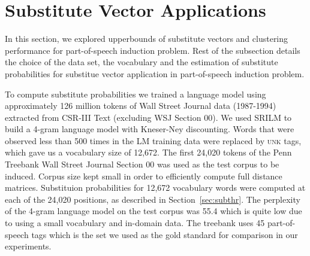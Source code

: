 \section{Substitute Vector Applications}
\label{sec:subapp}
In this section, we explored upperbounds of substitute vectors and
clustering performance for part-of-speech induction problem. Rest of
the subsection details the choice of the data set, the vocabulary and
the estimation of substitute probabilities for substitue vector
application in part-of-speech induction problem.

To compute substitute probabilities we trained a language model using
approximately 126 million tokens of Wall Street Journal data
(1987-1994) extracted from CSR-III Text \cite{csr3text} (excluding WSJ
Section 00).
We used SRILM \cite{Stolcke2002} to build a 4-gram language model with
Kneser-Ney discounting.
Words that were observed less than 500 times in the LM training data
were replaced by \textsc{unk} tags, which gave us a vocabulary size of
12,672.
The first 24,020 tokens of the Penn Treebank \cite{treebank3} Wall
Street Journal Section 00 was used as the test corpus to be induced.
Corpus size kept small in order to efficiently compute full distance
matrices.  Substituion probabilities for 12,672 vocabulary words were
computed at each of the 24,020 positions, as described in
Section~\ref{sec:subthr}.
The perplexity of the 4-gram language model on the test corpus was
55.4 which is quite low due to using a small
vocabulary and in-domain data.
The treebank uses 45 part-of-speech tags which is the set we used as
the gold standard for comparison in our experiments.
